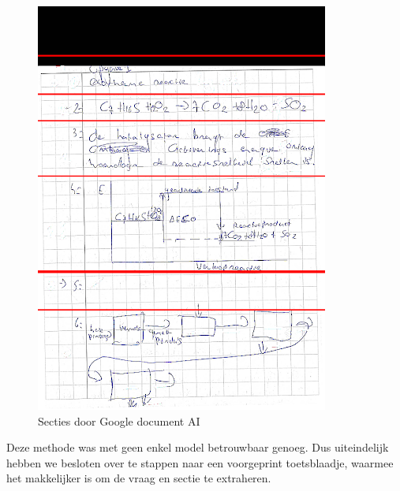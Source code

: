 \documentclass[12pt]{article}
\begin{document}
\begin{multicols}{2}
\begin{figure}
    \includegraphics[width=1\linewidth]{./images/methoden/inscannen/sectie/hand/section.png}
    \caption{Secties door Google document AI}
    \label{fig:enter-label}
\end{figure}
Deze methode was met geen enkel model betrouwbaar genoeg.
Dus uiteindelijk hebben we besloten over te stappen naar een voorgeprint toetsblaadje, waarmee het makkelijker is  om de vraag en sectie te extraheren.
\end{multicols} 
\pagebreak
\end{document}
